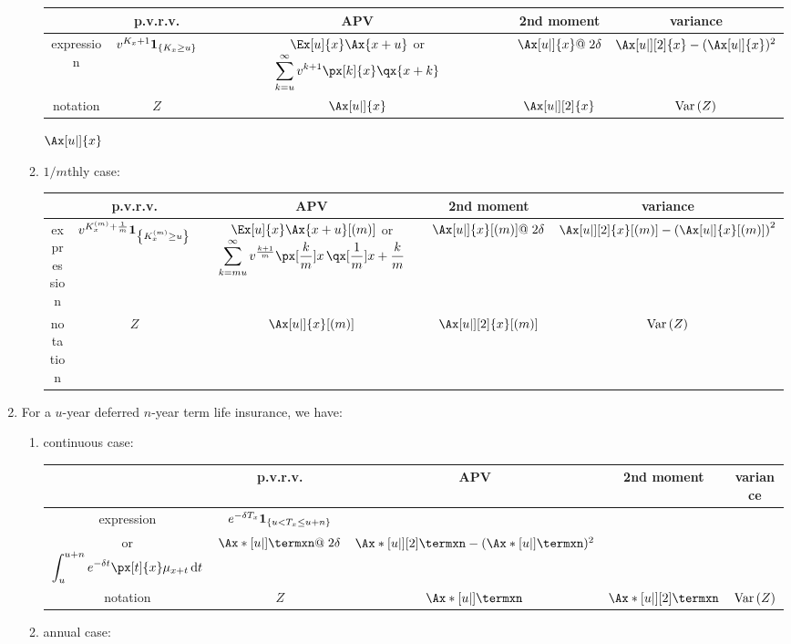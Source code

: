 \begin{enumerate}
\begin{enumerate}
\begin{tabular}{ccccc}
\toprule
&p.v.r.v.&APV&2nd moment&variance\\
\midrule
expression&\(v^{K_x+1}\mathbf{1}_{\left\{K_x\ge u\right\}}\)
&\(\Ex[u]{x}\Ax{x+u}\) or \(\displaystyle\sum_{k=u}^{\infty}v^{k+1}\px[k]{x}\qx{x+k}\)
&\(\Ax[u|]{x}@\;2\delta\)&\(\Ax[u|][2]{x}-(\Ax[u|]{x})^2\)\\
notation&\(Z\)&\(\Ax[u|]{x}\)&\(\Ax[u|][2]{x}\)&\(\operatorname{Var}\qty(Z)\)\\
\bottomrule
\end{tabular}
\(\Ax[u|]{x}\)
\item \(1/m\)thly case:
\label{it:deferred-1m-whole-life-fmlas}

\begin{tabular}{ccccc}
\toprule
&p.v.r.v.&APV&2nd moment&variance\\
\midrule
expression&\(v^{K_x^{(m)}+\frac{1}{m}}\mathbf{1}_{\left\{K_x^{(m)}\ge u\right\}}\)
&\(\Ex[u]{x}\Ax{x+u}[(m)]\) or \(\displaystyle\sum_{k=mu}^{\infty}v^{\frac{k+1}{m}}\px[\frac{k}{m}]{x}\,\qx[\frac{1}{m}]{x+\frac{k}{m}}\)
&\(\Ax[u|]{x}[(m)]@\;2\delta\)&\(\Ax[u|][2]{x}[(m)]-\qty(\Ax[u|]{x}[(m)])^2\)\\
notation&\(Z\)&\(\Ax[u|]{x}[(m)]\)&\(\Ax[u|][2]{x}[(m)]\)&\(\operatorname{Var}\qty(Z)\)\\
\bottomrule
\end{tabular}
\end{enumerate}

\item For a \(u\)-year deferred \(n\)-year term life insurance, we have:
\begin{enumerate}
\item continuous case:
\label{it:deferred-cts-term-life-fmlas}

\begin{tabular}{ccccc}
\toprule
&p.v.r.v.&APV&2nd moment&variance\\
\midrule
expression&\(e^{-\delta T_x}\mathbf{1}_{\left\{u<T_x\le u+n\right\}}\)
&\makecell{\(\Ex[u]{x}\Ax*{\itop{(x+u)}:\angl{n}}\)\\ or \(\displaystyle\int_{u}^{u+n}e^{-\delta t}\px[t]{x}\mu_{x+t}\dd{t}\)}
&\(\Ax*[u|]{\termxn}@\;2\delta\)&\(\Ax*[u|][2]{\termxn}-(\Ax*[u|]{\termxn})^2\)\\
notation&\(Z\)&\(\Ax*[u|]{\termxn}\)&\(\Ax*[u|][2]{\termxn}\)&\(\operatorname{Var}\qty(Z)\)\\
\bottomrule
\end{tabular}
\item annual case:
\label{it:deferred-annual-term-life-fmlas}


\end{enumerate}
\end{enumerate}
